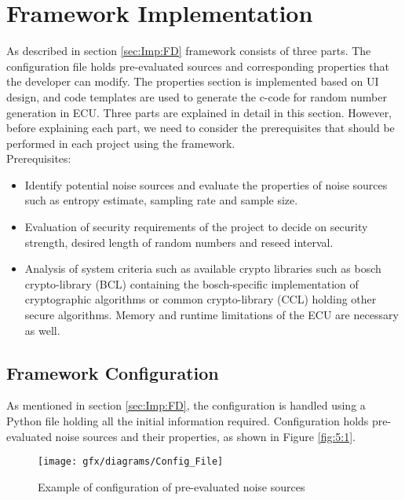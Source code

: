 \section{Framework Implementation}
\label{sec:Imp:FI}
As described in section \ref{sec:Imp:FD} framework consists of three parts. The configuration file holds pre-evaluated sources and corresponding properties that the developer can modify. The properties section is implemented based on UI design, and code templates are used to generate the c-code for random number generation in ECU. Three parts are explained in detail in this section. However, before explaining each part, we need to consider the prerequisites that should be performed in each project using the framework.\\
Prerequisites:
\begin{itemize}
	\item Identify potential noise sources and evaluate the properties of noise sources such as entropy estimate, sampling rate and sample size.
	
	\item Evaluation of security requirements of the project to decide on security strength, desired length of random numbers and reseed interval.
	
	\item Analysis of system criteria such as available crypto libraries such as bosch crypto-library (BCL) containing the bosch-specific implementation of cryptographic algorithms or common crypto-library (CCL) holding other secure algorithms. Memory and runtime limitations of the ECU are necessary as well.
\end{itemize}


%
%
\subsection{Framework Configuration}
\label{subsec:Imp:FI:FC}
As mentioned in section \ref{sec:Imp:FD}, the configuration is handled using a Python file holding all the initial information required. Configuration holds pre-evaluated noise sources and their properties, as shown in Figure \ref{fig:5:1}.

\begin{figure}[!h]
	\centering
	\texttt{[image: gfx/diagrams/Config\_File]}
	\caption{Example of configuration of pre-evaluated noise sources}
	\label{fig:5:2}
\end{figure}

